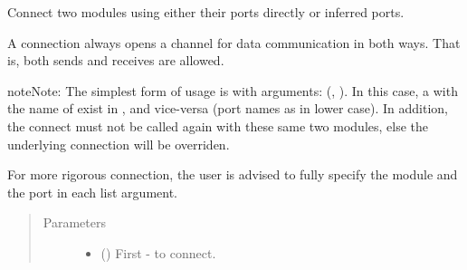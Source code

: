 \documentclass[letterpaper,10pt,openany,oneside,english]{sphinxmanual}
\begin{document}
\begin{fulllineitems}

\begin{fulllineitems}
\label{\detokenize{src_rst/network:network.Network.connect}}
Connect two modules using either their ports directly or inferred ports.

A connection always opens a channel for data communication in both ways.
That is, both sends and receives are allowed.

\begin{sphinxadmonition}{note}{Note:}
The simplest form of usage is with arguments: (, ).
In this case, a  with the name of   exist in ,
and vice-versa (port names as  in lower case). In addition, the connect
must not be called again with these same two modules, else the underlying
connection will be overriden.

For more rigorous connection, the user is advised to fully specify the
module and the port in each list argument.
\end{sphinxadmonition}
\begin{quote}\begin{description}
\item[{Parameters}] \leavevmode\begin{itemize}
\item {} 
 (\sphinxstyleliteralemphasis{\sphinxupquote{(}}\sphinxstyleliteralemphasis{\sphinxupquote{{[}}}{\hyperref[\detokenize{src_rst/module:module.Module}]{\sphinxcrossref{\sphinxstyleliteralemphasis{\sphinxupquote{Module}}}}}\sphinxstyleliteralemphasis{\sphinxupquote{{]}}}\sphinxstyleliteralemphasis{\sphinxupquote{(}}\sphinxstyleliteralemphasis{\sphinxupquote{{[}}}{\hyperref[\detokenize{src_rst/module:module.Module}]{\sphinxcrossref{\sphinxstyleliteralemphasis{\sphinxupquote{Module}}}}}\sphinxstyleliteralemphasis{\sphinxupquote{,}}\sphinxstyleliteralemphasis{\sphinxupquote{{]}}}) \textendash{} First - to connect.


\end{itemize}
\end{description}
\end{quote}
\end{fulllineitems}
\end{fulllineitems}
\end{document}
